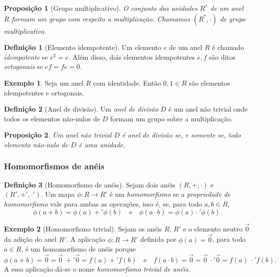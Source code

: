 \documentclass[a4paper,12pt]{report}
\theoremstyle{plain}
\newtheorem{proposicao}{Proposição}[section]
\theoremstyle{definition}
\newtheorem{definicao}{Definição}[section]
\newtheorem{exemplo}{Exemplo}[section]
\begin{document}
	\begin{proposicao}[Grupo multiplicativo]
		O conjunto das unidades $R^*$ de um anel $R$ formam um grupo com respeito a multiplicação. Chamamos $(R^*,\cdot)$ de \emph{grupo multiplicativo}.
	\end{proposicao}
	
	\begin{definicao}[Elemento idempotente]
		Um elemento $e$ de um anel $R$ é chamado \emph{idempotente} se $e^2 = e$. Além disso, dois elementos idempotentes $e,f$ são ditos \emph{ortogonais} se $ef = fe = 0$.
	\end{definicao}
	
	\begin{exemplo}
		Seja um anel $R$ com identidade. Então $0,1 \in R$ são elementos idempotentes e ortogonais.
	\end{exemplo}
	
	\begin{definicao}[Anel de divisão]
		Um \emph{anel de divisão} $D$ é um anel não trivial onde todos os elementos não-nulos de $D$ formam um grupo sobre a multiplicação. 
	\end{definicao}
	
	\begin{proposicao}
		Um anel não trivial $D$ é anel de divisão se, e somente se, todo elemento não-nulo de $D$ é uma unidade.	
	\end{proposicao}
	
	\subsubsection{Homomorfismos de anéis}
	
	\begin{definicao}[Homomorfismo de anéis]
		Sejam dois anéis $(R, +, \cdot)$ e $(R', +', \cdot')$. Um mapa $\phi: R \longrightarrow R'$ é um \emph{homomorfismo} se a \emph{propriedade de homomorfismo} vale para ambas as operações, isso é, se, para todo $a,b\in R$,
		$$\phi(a+b) = \phi(a) +' \phi(b) \quad \text{e} \quad \phi(a\cdot b) = \phi(a) \cdot' \phi(b).$$
	\end{definicao}
	
	\begin{exemplo}[Homomorfismo trivial]
		Sejam os anéis $R$, $R'$ e o elemento neutro $\vec 0$ da adição do anel $R'$. A aplicação $\phi: R\longrightarrow R'$ definida por $\phi(a) = \vec 0$, para todo $a\in R$, é um homomorfismo de anéis porque $$\phi(a + b) = \vec 0 = \vec 0 \ +' \vec 0 = f(a) +' f(b) \quad \text{e} \quad f(a\cdot b) = \vec 0 = \vec 0 \ \cdot' \vec 0 = f(a)\ \cdot' f(b).$$
		A essa aplicação dá-se o nome \emph{homomorfismo trivial de anéis}.
	\end{exemplo}
	
\end{document}
